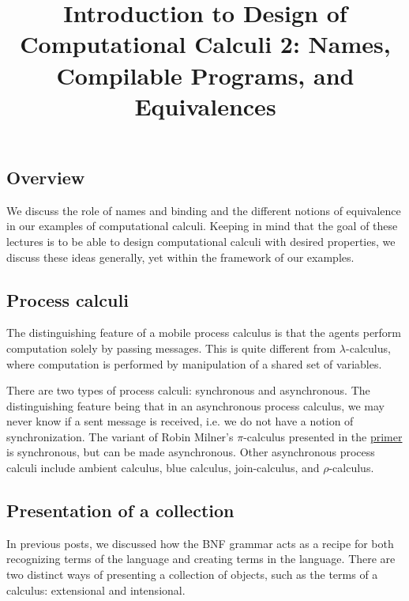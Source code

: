 \documentclass[12pt]{article}
\numberwithin{equation}{section}
\begin{document}
\author{}
\date{}
\title{Introduction to Design of Computational Calculi 2: Names, Compilable Programs, and Equivalences}

\maketitle

\subsection{Overview}
We discuss the role of names and binding and the different notions of equivalence in our examples of computational calculi. Keeping in mind that the goal of these lectures is to be able to design computational calculi with desired properties, we discuss these ideas generally, yet within the framework of our examples.

\subsection{Process calculi}
The distinguishing feature of a mobile process calculus is that the agents perform computation solely by passing messages. This is quite different from $\lambda$-calculus, where computation is performed by manipulation of a shared set of variables.

There are two types of process calculi: synchronous and asynchronous. The distinguishing feature being that in an asynchronous process calculus, we may never know if a sent message is received, i.e. we do not have a notion of synchronization. The variant of Robin Milner's $\pi$-calculus presented in the \href{https://blog.rchain.coop/calculus-primer-\%cf\%80-calculus/}{primer} is synchronous, but can be made asynchronous. Other asynchronous process calculi include ambient calculus, blue calculus, join-calculus, and $\rho$-calculus.


\subsection{Presentation of a collection}
In previous posts, we discussed how the BNF grammar acts as a recipe for both recognizing terms of the language and creating terms in the language. There are two distinct ways of presenting a collection of objects, such as the terms of a calculus: extensional and intensional.
\end{document}
